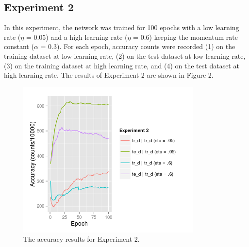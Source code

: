 \documentclass[12pt]{article}
\begin{document}
\subsection{Experiment 2}
In this experiment, the network was trained for 100 epochs with a low learning rate ($\eta$ = 0.05) and a high learning rate ($\eta$ = 0.6) keeping the momentum rate constant ($\alpha$ = 0.3). For each epoch, accuracy counts were recorded (1) on the training dataset at low learning rate, (2) on the test dataset at low learning rate, (3) on the training dataset at high learning rate, and (4) on the test dataset at high learning rate. The results of Experiment 2 are shown in Figure 2.
\begin{figure}
  \begin{center}
    \includegraphics{Rplot2.png}
    \caption{The accuracy results for Experiment 2.}
  \end{center}
\end{figure}
\end{document}
